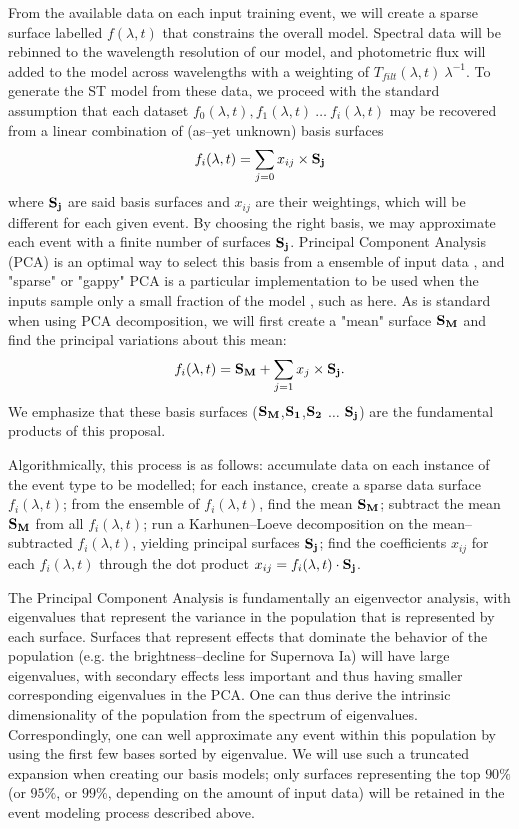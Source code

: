 From the available data on each input training event, we will create a sparse
surface labelled $f(\lambda, t)$ that constrains the overall model.  Spectral
data will be rebinned to the wavelength resolution of our model, and photometric
flux will added to the model across wavelengths with a weighting of
$T_{filt}(\lambda, t)~\lambda^{-1}$.  To generate the ST model from these data,
we proceed with the standard assumption that each dataset $f_0(\lambda, t),
f_1(\lambda, t)~\ldots~f_i(\lambda, t)$ may be recovered from a linear
combination of (as--yet unknown) basis surfaces $$f_i(\lambda, t) = \sum_{j=0}
x_{ij} \times {\bf S_j}$$ where $\bf S_j$ are said basis surfaces and $x_{ij}$
are their weightings, which will be different for each given event.  By choosing
the right basis, we may approximate each event with a finite number of surfaces
$\bf S_j$. Principal Component Analysis (PCA) is an optimal way to select this
basis from a ensemble of input data \cite[e.g.][for astrophysical application to
galaxy spectra]{1995AJ....110.1071C}, and "sparse" or "gappy" PCA is a
particular implementation to be used when the inputs sample only a small
fraction of the model \citep{zouht04}, such as here.  As is standard when using
PCA decomposition, we will first create a "mean" surface ${\bf S_M}$ and find
the principal variations about this mean: $$f_i(\lambda, t) = {\bf S_M} +
\sum_{j=1} x_j \times {\bf S_j}.$$ We emphasize that these basis surfaces (${\bf
S_M}$,${\bf S_1}$,${\bf S_2}$ $\ldots$ ${\bf S_j}$) are the fundamental products
of this proposal.

Algorithmically, this process is as follows: accumulate data on each instance of
the event type to be modelled; for each instance, create a sparse data surface
$f_i(\lambda, t)$; from the ensemble of $f_i(\lambda, t)$, find the mean ${\bf
S_M}$; subtract the mean ${\bf S_M}$ from all $f_i(\lambda, t)$; run a
Karhunen--Loeve decomposition \citep{Karhunen:47,Loeve:48} on the
mean--subtracted $f_i(\lambda, t)$, yielding principal surfaces ${\bf S_j}$;
find the coefficients $x_{ij}$ for each $f_i(\lambda, t)$ through the dot
product $x_{ij} = f_i(\lambda, t) \cdot {\bf S_j}$.

 The Principal Component
Analysis is fundamentally an eigenvector analysis, with eigenvalues that
represent the variance in the population that is represented by each surface.
Surfaces that represent effects that dominate the behavior of the population
(e.g. the brightness--decline for Supernova Ia) will have large eigenvalues,
with secondary effects less important and thus having smaller corresponding
eigenvalues in the PCA.  One can thus derive the intrinsic dimensionality of the
population from the spectrum of eigenvalues. Correspondingly, one can well
approximate any event within this population by using the first few bases sorted
by eigenvalue.  We will use such a truncated expansion when creating our basis
models; only surfaces representing the top $90\%$ (or $95\%$, or $99\%$,
depending on the amount of input data) will be retained in the event modeling
process described above.

